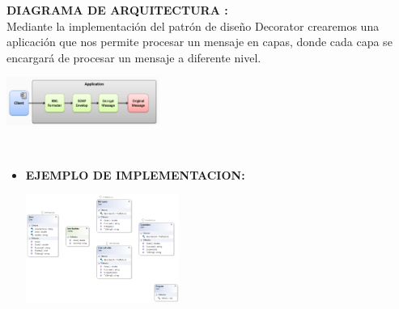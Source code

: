 \documentclass[twoside,twocolumn]{article}
\begin{document}
	\item \textbf{DIAGRAMA DE ARQUITECTURA :}	\\
        Mediante la implementación del patrón de diseño Decorator crearemos una aplicación que nos permite procesar un mensaje en capas, donde cada capa se encargará de procesar un mensaje a diferente nivel.
        
        \begin{center}
            \includegraphics[width=5cm]{./img/Imagen7.png} 
        \end{center}
        \\

        \begin{itemize}
        \item \textbf{EJEMPLO DE IMPLEMENTACION:}	
        
        \begin{center}
            \includegraphics[width=5cm]{./img/Imagen8.png} 
        \end{center}
        \\

        \end{itemize} 
\end{document}
